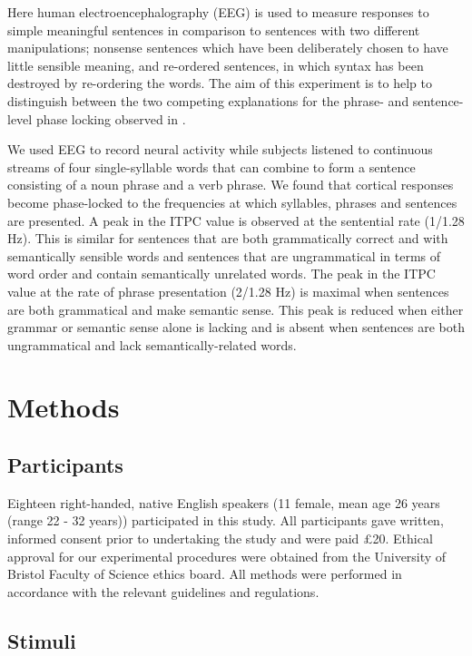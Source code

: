 \documentclass[a4paper,10pt,twoside]{article}
\begin{document}
Here human electroencephalography (EEG) is used to measure responses to
simple meaningful sentences in comparison to sentences with two different
manipulations; nonsense sentences which have been deliberately chosen
to have little sensible meaning, and re-ordered sentences, in which
syntax has been destroyed by re-ordering the words. The aim of this
experiment is to help to distinguish between the two competing
explanations for the phrase- and sentence-level phase locking observed
in \cite{DingEtAl2016,DingEtAl2017}.

We used EEG to record neural activity while subjects listened to continuous streams of four single-syllable words that can combine to form a sentence consisting of a noun phrase and a verb phrase. We found that cortical responses become phase-locked to the frequencies at which syllables, phrases and
sentences are presented. A peak in the ITPC value is observed at the sentential rate (1/1.28 Hz). This is similar for sentences that are both grammatically correct and with semantically sensible words and sentences that are ungrammatical in terms of word order and contain semantically
 unrelated words. The peak in the ITPC value at the rate of phrase presentation
 (2/1.28 Hz) is maximal when sentences are both grammatical and make
 semantic sense. This peak is reduced when either grammar or
 semantic sense alone is lacking and is absent when sentences are both ungrammatical and
 lack semantically-related words. 


\section*{Methods}
\subsection*{Participants}

Eighteen right-handed, native English speakers (11 female, mean age 26
years (range 22 - 32 years)) participated in this study. All
participants gave written, informed consent prior to undertaking the
study and were paid £20. Ethical approval for our experimental procedures were obtained from the University of Bristol Faculty of Science ethics board. All methods were performed in accordance with the relevant guidelines and regulations.

\subsection*{Stimuli}
\end{document}
